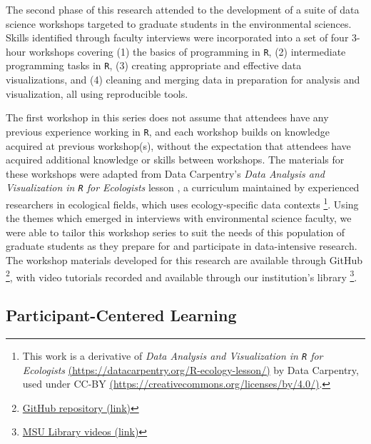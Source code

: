 \documentclass[12pt]{article}
\begin{document}
\quad The second phase of this research attended to the  development of a suite
of data science workshops targeted to graduate students in the environmental
sciences. Skills identified through faculty interviews were incorporated into a
set of four 3-hour workshops covering (1) the basics of programming in 
\texttt{R}, (2) intermediate programming tasks in \texttt{R}, (3) creating
appropriate and effective data visualizations, and (4) cleaning and merging data
in preparation for analysis and visualization, all using reproducible tools. 

\quad The first workshop in this series does not assume that attendees have any
previous experience working in \texttt{R}, and each workshop builds on knowledge
acquired at previous workshop(s), without the expectation that attendees have
acquired additional knowledge or skills between workshops. The materials for 
these workshops were adapted from Data Carpentry's \emph{Data Analysis and
Visualization in \texttt{R} for Ecologists} lesson \citep{ecology_curriculum}, a
curriculum maintained by experienced researchers in ecological fields, which 
uses ecology-specific data contexts \footnote{This work is a derivative of 
\emph{Data Analysis and Visualization in \texttt{R} for Ecologists} 
\href{https://datacarpentry.org/R-ecology-lesson/}{(https://datacarpentry.org/R-ecology-lesson/)}
by Data Carpentry, used under CC-BY 
\href{https://creativecommons.org/licenses/by/4.0/}{(https://creativecommons.org/licenses/by/4.0/)}.}. 
Using the themes which emerged in interviews with environmental science faculty,
we were able to tailor this workshop series to suit the needs of this population
of graduate students as they prepare for and participate in data-intensive
research. The workshop materials developed for this research are available
through GitHub
\footnote{\href{https://github.com/atheobold/data-science-workshops-jse}{GitHub
repository (link)}}, with video tutorials recorded and available through our
institution's library 
\footnote{\href{http://bit.ly/ws_recordings}{MSU Library videos (link)}}.  


\subsection{Participant-Centered Learning}  
\end{document}
